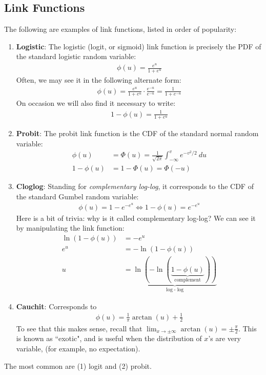 \documentclass[12pt, a4paper]{article}
\theoremstyle{definition}
\begin{document}
	\subsection*{Link Functions}
	The following are examples of link functions, listed in order of popularity:
	\begin{enumerate}[label=(\arabic*)]
		\item \textbf{Logistic}: The logistic (logit, or sigmoid) link function is precisely the
		PDF of the standard logistic random variable:
		\begin{align*}
			\phi(u) = \frac{e^u}{1 + e^u}
		\end{align*}
		Often, we may see it in the following alternate form:
		\begin{align*}
			\phi(u) = \frac{e^u}{1 + e^u}\cdot \frac{e^{-u}}{e^{-u}} = \frac{1}{1 + e^{-u}}
		\end{align*}
		On occasion we will also find it necessary to write:
		\begin{align*}
			1-\phi(u) = \frac{1}{1 + e^{u}}
		\end{align*}
		\item \textbf{Probit}: The probit link function is the CDF of the standard
		normal random variable:
		\begin{align*}
			\phi(u) &= \Phi(u) = \frac{1}{\sqrt{2\pi}} \int_{-\infty}^{v}e^{-v^2/2}\ du\\
			1-\phi(u) &= 1-\Phi(u)=\Phi(-u)
		\end{align*}
		\item \textbf{Cloglog}: Standing for \textit{complementary log-log}, it corresponds to
		the CDF of the standard Gumbel random variable:
		\begin{align*}
			\phi(u) = 1 - e^{-e^u}\iff 1-\phi(u) = e^{-e^u}
		\end{align*}
		Here is a bit of trivia: why is it called complementary log-log? We can see it
		by manipulating the link function:
		\begin{align*}
			\ln(1-\phi(u)) &= -e^u \\
			e^u &= -\ln(1-\phi(u))\\
			u&=\underbrace{\ln(-\ln(\underbrace{1-\phi(u)}_{\text{complement}}))}_{\log\text{-}\log}
		\end{align*}
		\item \textbf{Cauchit}: Corresponds to
		\begin{align*}
			\phi(u) = \frac{1}{\pi} \arctan(u) + \frac{1}{2}
		\end{align*}
		To see that this makes sense, recall that $\lim_{x\to\pm \infty}\arctan(u) = \pm \frac{\pi}{2}$.
		This is known as ``exotic", and is useful when the distribution of $x$'s are very
		variable, (for example, no expectation).
	\end{enumerate}
	The most common are (1) logit and (2) probit.
\end{document}
